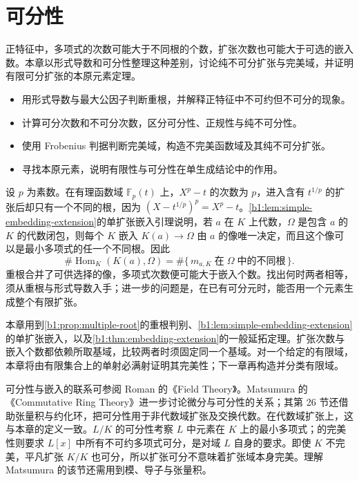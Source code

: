 
\chapter{可分性}
\label{b1:ch:16}

\begin{chapterabstract}
	正特征中，多项式的次数可能大于不同根的个数，扩张次数也可能大于可选的嵌入数。本章以形式导数和可分性整理这种差别，讨论纯不可分扩张与完美域，并证明有限可分扩张的本原元素定理。
\end{chapterabstract}

\begin{learninggoals}
	\begin{itemize}
		\item 用形式导数与最大公因子判断重根，并解释正特征中不可约但不可分的现象。
		\item 计算可分次数和不可分次数，区分可分性、正规性与纯不可分性。
		\item 使用 Frobenius 判据判断完美域，构造不完美函数域及其纯不可分扩张。
		\item 寻找本原元素，说明有限性与可分性在单生成结论中的作用。
	\end{itemize}
\end{learninggoals}

设 \(p\) 为素数。在有理函数域 \(\mathbb F_p(t)\) 上，\(X^p-t\) 的次数为 \(p\)，进入含有 \(t^{1/p}\) 的扩张后却只有一个不同的根，因为 \((X-t^{1/p})^p=X^p-t\)。\cref{b1:lem:simple-embedding-extension}的单扩张嵌入引理说明，若 \(a\) 在 \(K\) 上代数，\(\Omega\) 是包含 \(a\) 的 \(K\) 的代数闭包，则每个 \(K\) 嵌入 \(K(a)\rightarrow\Omega\) 由 \(a\) 的像唯一决定，而且这个像可以是最小多项式的任一个不同根。因此
\[
	\#\operatorname{Hom}_K(K(a),\Omega) =\#\{\,m_{a,K}\;\text{在}\;\Omega\;\text{中的不同根}\,\}.
\]
重根合并了可供选择的像，多项式次数便可能大于嵌入个数。找出何时两者相等，须从重根与形式导数入手；进一步的问题是，在已有可分元时，能否用一个元素生成整个有限扩张。

\ProseParagraphBreak

本章用到\cref{b1:prop:multiple-root}的重根判别、\cref{b1:lem:simple-embedding-extension}的单扩张嵌入，以及\cref{b1:thm:embedding-extension}的一般延拓定理。扩张次数与嵌入个数都依赖所取基域，比较两者时须固定同一个基域。对一个给定的有限域，本章将由有限集合上的单射必满射证明其完美性；下一章再构造并分类有限域。

\ProseParagraphBreak
可分性与嵌入的联系可参阅 Roman 的《Field Theory》\cite[Sections 3.1--3.6]{Roman2006FieldTheory}。Matsumura 的《Commutative Ring Theory》\cite[Sections 25--26]{Matsumura1989CommutativeRingTheory}进一步讨论微分与可分性的关系；其第 26 节还借助张量积与约化环，把可分性用于非代数域扩张及交换代数。在代数域扩张上，这与本章的定义一致。\(L/K\) 的可分性考察 \(L\) 中元素在 \(K\) 上的最小多项式；的完美性则要求 \(L[x]\) 中所有不可约多项式可分，是对域 \(L\) 自身的要求。即使 \(K\) 不完美，平凡扩张 \(K/K\) 也可分，所以扩张可分不意味着扩张域本身完美。理解 Matsumura 的该节还需用到模、导子与张量积。

